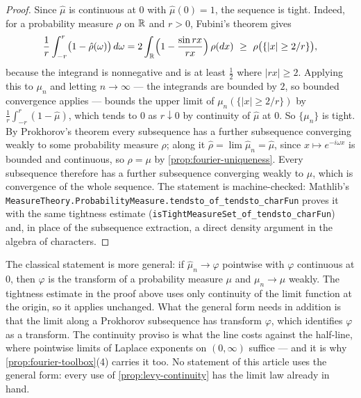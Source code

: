 \begin{proof}\leanok
Since $\hat\mu$ is continuous at $0$ with $\hat\mu(0) = 1$, the sequence is tight. Indeed, for a
probability measure $\rho$ on $\mathbb{R}$ and $r > 0$, Fubini's theorem gives
\[
  \frac1r\int_{-r}^{r}\bigl(1 - \hat\rho(\omega)\bigr)\,d\omega
  = 2\int_{\mathbb{R}}\Bigl(1 - \frac{\sin rx}{rx}\Bigr)\,\rho(dx)
  \ \ge\ \rho\bigl(\{|x| \ge 2/r\}\bigr),
\]
because the integrand is nonnegative and is at least $\tfrac12$ where $|rx| \ge 2$. Applying
this to $\mu_n$ and letting $n \to \infty$ --- the integrands are bounded by $2$, so bounded
convergence applies --- bounds the upper limit of $\mu_n(\{|x| \ge 2/r\})$ by
$\frac1r\int_{-r}^r(1 - \hat\mu)$, which tends to $0$ as $r \downarrow 0$ by continuity of
$\hat\mu$ at $0$. So $\{\mu_n\}$ is tight. By Prokhorov's theorem every subsequence has a
further subsequence converging weakly to some probability measure $\rho$; along it
$\hat\rho = \lim \hat\mu_n = \hat\mu$, since $x \mapsto e^{-i\omega x}$ is bounded and
continuous, so $\rho = \mu$ by \ref{prop:fourier-uniqueness}. Every subsequence therefore has a
further subsequence converging weakly to $\mu$, which is convergence of the whole sequence.
The statement is machine-checked: Mathlib's
\texttt{MeasureTheory.ProbabilityMeasure.tendsto\_of\_tendsto\_charFun} proves it with the same
tightness estimate (\texttt{isTightMeasureSet\_of\_tendsto\_charFun}) and, in place of the
subsequence extraction, a direct density argument in the algebra of characters.
\end{proof}

\begin{remark}\label{rem:levy-continuity-general}
The classical statement is more general: if $\hat\mu_n \to \varphi$ pointwise with $\varphi$
continuous at $0$, then $\varphi$ is the transform of a probability measure $\mu$ and
$\mu_n \to \mu$ weakly. The tightness estimate in the proof above uses only continuity of the
limit function at the origin, so it applies unchanged. What the general form needs in addition
is that the limit along a Prokhorov subsequence has transform $\varphi$, which identifies
$\varphi$ as a transform. The continuity proviso is what the line costs against the half-line,
where pointwise limits of Laplace exponents on $(0,\infty)$ suffice --- and it is why
\ref{prop:fourier-toolbox}(4) carries it too. No statement of this article uses the general
form: every use of \ref{prop:levy-continuity} has the limit law already in hand.
\end{remark}

